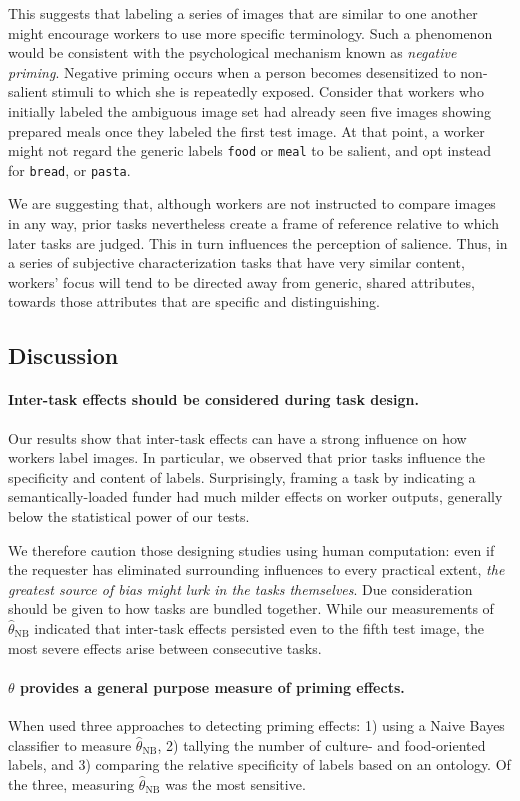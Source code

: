 \documentclass[letterpaper]{article}
\begin{document}
This suggests that labeling a series of images that are similar to 
one another might encourage workers to use more specific terminology.
Such a phenomenon would be consistent with the psychological mechanism known 
as \textit{negative priming}.  Negative priming occurs when a person becomes 
desensitized to non-salient stimuli to which she is repeatedly 
exposed.  Consider that workers who initially 
labeled the ambiguous image set had already seen five images showing 
prepared meals once they labeled the first test image.  At that point,
a worker might not regard the generic labels \texttt{food} or \texttt{meal} 
to be salient, and opt instead for \texttt{bread}, or \texttt{pasta}.

We are suggesting that, although workers are not instructed to compare
images in any way, prior tasks nevertheless create a frame of reference
relative to which later tasks are judged.  This in turn 
influences the perception of salience. Thus, in a series of subjective 
characterization tasks that have very similar content, workers' focus 
will tend to be directed away from generic, shared attributes, towards those 
attributes that are specific and distinguishing.
\subsection*{Discussion}
\paragraph{Inter-task effects should be considered during task design.}  
Our results show that inter-task effects can have a strong influence on how
workers label images.  In particular, we observed that prior tasks influence
the specificity and content of labels.  Surprisingly, framing a task by 
indicating a semantically-loaded funder had much milder effects on worker 
outputs, generally below the statistical power of our tests.

We therefore caution those designing studies using human computation: even if 
the requester has eliminated surrounding influences to every practical extent, 
\textit{the greatest source of bias might lurk in the tasks themselves}.
Due consideration should be given to how tasks are bundled together.
While our measurements of $\hat{\theta}_\text{NB}$ indicated that inter-task 
effects persisted even to the fifth test image, the most severe effects arise 
between consecutive tasks.
\paragraph{$\theta$ provides a general purpose measure of priming effects.}
When used three approaches to detecting priming effects: 1) using a Naive Bayes
classifier to measure $\hat{\theta}_\text{NB}$, 2) tallying the number of 
culture- and food-oriented labels, and 3) comparing the relative specificity
of labels based on an ontology.  Of the three, measuring $
\hat{\theta}_\text{NB}$ was the most sensitive.  
\end{document}
